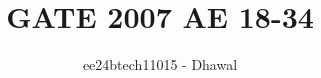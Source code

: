 \documentclass[journal]{IEEEtran}
\begin{document}

\vspace{3cm}


\title{GATE 2007 AE 18-34}
\author{ee24btech11015 - Dhawal}
\maketitle
{\let\newpage\relax\maketitle}

\renewcommand{\thefigure}{\theenumi}
\renewcommand{\thetable}{\theenumi}
\setlength{\intextsep}{10pt} %
\end{document}
